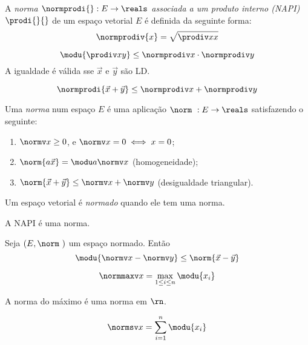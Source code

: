 \begin{definition}
	A \emph{norma $\normprodi{} : E \to \reals$ associada a um produto interno (NAPI)}
	$\prodi{}{}$
	 de um espaço vetorial $E$ é definida da seguinte forma:
	\[\normprodiv{x} = \sqrt{\prodiv xx}\]
\end{definition}

\begin{theorem}
	\[\modu{\prodiv xy} \le \normprodiv x \cdot \normprodiv y \]
	A igualdade é válida sse $\vec x$ e $\vec y$ são LD.
\end{theorem}

\begin{fact}
	\[\normprodi{\vec x + \vec y} \le \normprodiv x + \normprodiv y \]
\end{fact}

\begin{definition}
	Uma \emph{norma} num espaço $E$ é uma aplicação $\norm\  : E \to \reals$
	satisfazendo o seguinte:
	\begin{enumerate}
		\item $\normv x \ge 0$, e $\normv x = 0 \iff x = 0$;
		\item $\norm{a\vec x} = \modu a \normv x$ (homogeneidade);
		\item $\norm{\vec x + \vec y} \le \normv x + \normv y$ (desigualdade triangular).
	\end{enumerate}
	Um espaço vetorial é \emph{normado} quando ele tem uma norma.
\end{definition}

\begin{fact}
	A NAPI é uma norma.
\end{fact}

\begin{fact}
	Seja $(E,\norm\ )$ um espaço normado. Então 
	\[\modu{\normv x - \normv y} \le \norm{\vec x - \vec y}\]
\end{fact}

\begin{definition}
	\[\normmaxv x = \max\limits_{1\le i \le n}\modu{x_i}\]
\end{definition}

\begin{fact}
	A norma do máximo é uma norma em $\rn$.
\end{fact}

\begin{definition}
	\[\normsv x = \sum\limits_{i=1}^n \modu{x_i}\]
\end{definition}

